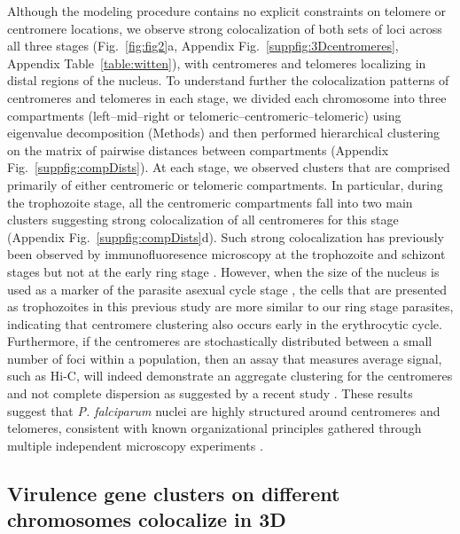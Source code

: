 Although the modeling procedure contains no explicit constraints on telomere
or centromere locations, we observe strong colocalization of both sets of loci
across all three stages (Fig.~\ref{fig:fig2}a, Appendix
Fig.~\ref{suppfig:3Dcentromeres}, Appendix Table~\ref{table:witten}),
with centromeres and telomeres localizing in distal regions of the nucleus. To
understand further the colocalization patterns of centromeres and telomeres in
each stage, we divided each chromosome into three compartments
(left--mid--right or telomeric--centromeric--telomeric) using eigenvalue
decomposition (Methods) and then performed hierarchical clustering on the
matrix of pairwise distances between compartments (Appendix
Fig.~\ref{suppfig:compDists}). At each stage, we observed clusters that are
comprised primarily of either centromeric or telomeric compartments. In
particular, during the trophozoite stage, all the centromeric compartments
fall into two main clusters suggesting strong colocalization of all
centromeres for this stage (Appendix Fig.~\ref{suppfig:compDists}d).
Such strong colocalization has previously been observed by immunofluoresence
microscopy at the trophozoite and schizont stages but not at the early ring
stage \citep{hoeijmakers:plasmodium}. However, when the size of the nucleus is
used as a marker of the parasite asexual cycle stage \citep{bannister:making,
weiner:3d}, the cells that are presented as trophozoites in this previous
study \citep{hoeijmakers:plasmodium} are more similar to our ring stage
parasites, indicating that centromere clustering also occurs early in the
erythrocytic cycle. Furthermore, if the centromeres are stochastically
distributed between a small number of foci within a population, then an assay
that measures average signal, such as Hi-C, will indeed demonstrate an
aggregate clustering for the centromeres and not complete dispersion as
suggested by a recent study \citep{lemieux:genome-wide}. These results suggest
that {\em P. falciparum} nuclei are highly structured around centromeres and
telomeres, consistent with known organizational principles gathered through
multiple independent microscopy experiments \citep{duraisingh:heterochromatin,
dzikowski:mechanisms, lopez-rubio:genome-wide, hoeijmakers:plasmodium}.


\subsection{Virulence gene clusters on different chromosomes colocalize in 3D}

